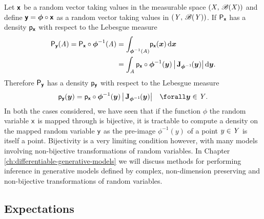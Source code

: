 Let $\boldsymbol{\mathsf{x}}$ be a random vector taking values in the measurable space $(\mathit{X},\,\mathscr{B}(\mathit{X}))$ and define $\boldsymbol{\mathsf{y}} = \boldsymbol{\phi} \circ \boldsymbol{\mathsf{x}}$ as a random vector taking values in  $(\mathit{Y},\,\mathscr{B}(\mathit{Y}))$. If $\mathsf{P}_{\boldsymbol{\mathsf{x}}}$ has a density $\mathsf{p}_{\boldsymbol{\mathsf{x}}}$ with respect to the Lebesgue measure %
\begin{equation}
\begin{split}
  \prob{\rvct{y}}(\set{A}) = \prob{\rvct{x}}\circ\vct{\phi}^{-1}(\set{A})
  &= \int_{\vct{\phi}^{-1}(\set{A})}\kern-2pt\pden{\rvct{x}}(\vct{x})\,\dr\vct{x}\\
  &= \int_{\set{A}} \pden{\rvct{x}}\circ\vct{\phi}^{-1}(\vct{y}) \,\left|\,\jacob{\vct{\phi}^{-1}}{\vct{y}}\right|\,\dr\vct{y}.
\end{split}
\end{equation}
Therefore $\mathsf{P}_{\boldsymbol{\mathsf{y}}}$ has a density $\mathsf{p}_{\boldsymbol{\mathsf{y}}}$ with respect to the Lebesgue measure 
\begin{equation}\label{eq:change-of-variables-vector-bijective}
  \pden{\rvct{y}}(\vct{y}) = 
    \pden{\rvct{x}}\circ\vct{\phi}^{-1}(\vct{y})\,
    \left|\,\jacob{\vct{\phi}^{-1}}{\vct{y}}\right|
  \quad \forall \vct{y} \in \set{Y}.
\end{equation}
In both the cases considered, we have seen that if the function $\phi$ the random variable $\mathsf{x}$ is mapped through is bijective, it is tractable to compute a density on the mapped random variable $\mathsf{y}$ as the pre-image $\phi^{-1}(y)$ of a point $y \in \mathit{Y}$ is itself a point. Bijectivity is a very limiting condition however, with many models involving non-bijective transformations of random variables. In Chapter \ref{ch:differentiable-generative-models} we will discuss methods for performing inference in generative models defined by complex, non-dimension preserving and non-bijective transformations of random variables.

\subsection{Expectations}\label{subsec:expectations}

